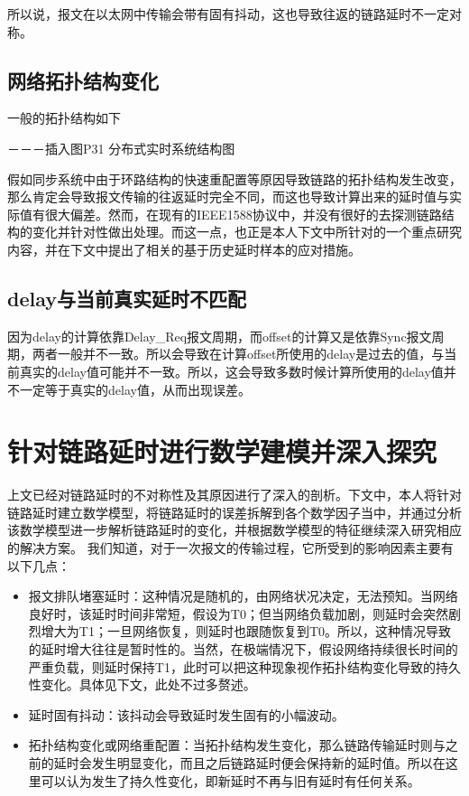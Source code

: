所以说，报文在以太网中传输会带有固有抖动，这也导致往返的链路延时不一定对称。

\subsection{网络拓扑结构变化}
一般的拓扑结构如下

－－－插入图P31 分布式实时系统结构图

假如同步系统中由于环路结构的快速重配置等原因导致链路的拓扑结构发生改变，那么肯定会导致报文传输的往返延时完全不同，而这也导致计算出来的延时值与实际值有很大偏差。然而，在现有的IEEE1588协议中，并没有很好的去探测链路结构的变化并针对性做出处理。而这一点，也正是本人下文中所针对的一个重点研究内容，并在下文中提出了相关的基于历史延时样本的应对措施。

\subsection{delay与当前真实延时不匹配}
因为delay的计算依靠Delay\_Req报文周期，而offset的计算又是依靠Sync报文周期，两者一般并不一致。所以会导致在计算offset所使用的delay是过去的值，与当前真实的delay值可能并不一致。所以，这会导致多数时候计算所使用的delay值并不一定等于真实的delay值，从而出现误差。

\section{针对链路延时进行数学建模并深入探究}
上文已经对链路延时的不对称性及其原因进行了深入的剖析。下文中，本人将针对链路延时建立数学模型，将链路延时的误差拆解到各个数学因子当中，并通过分析该数学模型进一步解析链路延时的变化，并根据数学模型的特征继续深入研究相应的解决方案。
我们知道，对于一次报文的传输过程，它所受到的影响因素主要有以下几点：
\begin{itemize}[noitemsep,topsep=0pt,parsep=0pt,partopsep=0pt]
	\item 报文排队堵塞延时：这种情况是随机的，由网络状况决定，无法预知。当网络良好时，该延时时间非常短，假设为T0；但当网络负载加剧，则延时会突然剧烈增大为T1；一旦网络恢复，则延时也跟随恢复到T0。所以，这种情况导致的延时增大往往是暂时性的。当然，在极端情况下，假设网络持续很长时间的严重负载，则延时保持T1，此时可以把这种现象视作拓扑结构变化导致的持久性变化。具体见下文，此处不过多赘述。
	\item 延时固有抖动：该抖动会导致延时发生固有的小幅波动。
	\item 拓扑结构变化或网络重配置：当拓扑结构发生变化，那么链路传输延时则与之前的延时会发生明显变化，而且之后链路延时便会保持新的延时值。所以在这里可以认为发生了持久性变化，即新延时不再与旧有延时有任何关系。
\end{itemize}

